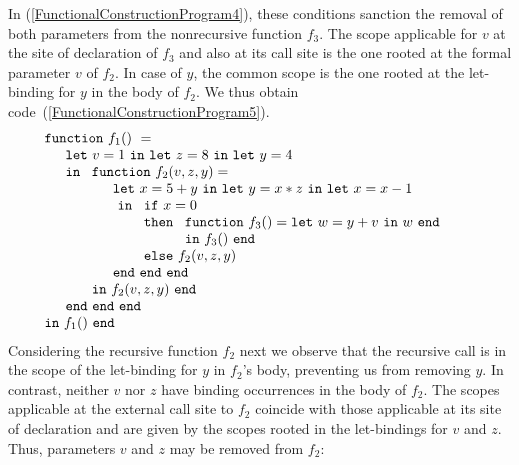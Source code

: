 In (\ref{FunctionalConstructionProgram4}), these conditions sanction
the removal of both parameters from the nonrecursive function $f_3$.
The scope applicable for $v$ at the site of declaration of $f_3$ and
also at its call site is the one rooted at the formal parameter $v$ of
$f_2$. In case of $y$, the common scope is the one rooted at the
let-binding for $y$ in the body of $f_2$. We thus obtain
code~(\ref{FunctionalConstructionProgram5}).
\begin{equation}
\label{FunctionalConstructionProgram5}
\begin{array}{l}
\mathtt{function}\ f_1()\ = \\
  \quad
  \begin{array}{l}
     \mathtt{let}\ v = 1 \ 
     \mathtt{in\ let}\ z = 8 \ 
     \mathtt{in\ let}\ y = 4\\
     \mathtt{in}\ 
     \begin{array}[t]{l}
       \mathtt{function}\ f_2(v,z,y) =\\
         \quad
         \begin{array}{l}
           \mathtt{let}\ x = 5+y\
           \mathtt{in\ let}\ y = x*z\
           \mathtt{in\ let}\ x = x-1\\\
           \mathtt{in}\
           \begin{array}[t]{l}
             \mathtt{if}\ x=0\\ 
             \mathtt{then}\ 
               \begin{array}[t]{l}
                 \mathtt{function}\ f_3() = 
                 \mathtt{let}\ w = y+v\ \mathtt{in}\ w\ \mathtt{end}\\
                 \mathtt{in}\ f_3()\ \mathtt{end}
               \end{array}\\
             \mathtt{else}\ f_2(v,z,y)
           \end{array}\\
           \mathtt{end\ end\ end}
         \end{array}\\
     \mathtt{in}\ f_2(v,z,y)\ \mathtt{end}
     \end{array}\\
     \mathtt{end\ end\ end}\\
   \end{array}\\
\mathtt{in}\ f_1()\  \mathtt{end}
\end{array}
\end{equation}
Considering the recursive function $f_2$ next we observe that the
recursive call is in the scope of the let-binding for $y$ in $f_2$'s
body, preventing us from removing $y$.  In contrast, neither $v$ nor
$z$ have binding occurrences in the body of $f_2$. The scopes
applicable at the external call site to $f_2$ coincide with those
applicable at its site of declaration and are given by the scopes
rooted in the let-bindings for $v$ and $z$. Thus, parameters $v$ and
$z$ may be removed from $f_2$:

